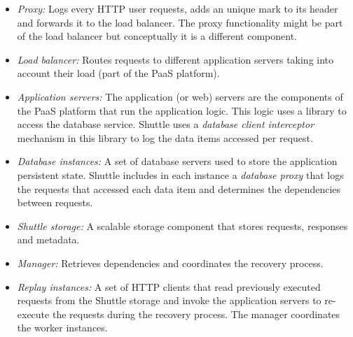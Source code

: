 \begin{itemize}
  \item \textit{Proxy:} Logs every \ac{HTTP} user requests, adds an unique mark to its header and forwards it to the load balancer. The proxy functionality might be part of the load balancer but conceptually it is a different component.%
  \item \textit{Load balancer:} Routes requests to different application servers taking into account their load (part of the \ac{PaaS} platform).
  \item \textit{Application servers:} The application (or web) servers are the components of the \ac{PaaS} platform that run the application logic. This logic uses a library to access the database service. Shuttle uses a \textit{database client interceptor} mechanism in this library to log the data items accessed per request.
  \item \textit{Database instances:} A set of database servers used to store the application persistent state. Shuttle includes in each instance  a \textit{database proxy} that logs the requests that accessed each data item and determines the dependencies between requests.
  \item \textit{Shuttle storage:} A scalable storage component that stores requests, responses and metadata.
  \item \textit{Manager:} Retrieves dependencies and coordinates the recovery process. 
  \item \textit{Replay instances:} A set of \ac{HTTP} clients that read previously executed requests from the Shuttle storage and invoke the application servers to re-execute the requests during the recovery process. The manager coordinates the worker instances.
  \end{itemize}



